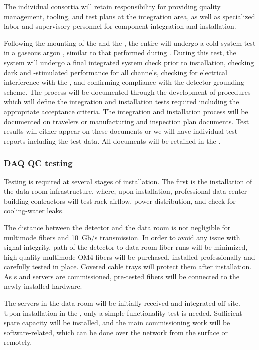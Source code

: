 The individual consortia will retain responsibility for providing quality management, tooling, and test plans at the integration area, as well as specialized labor and supervisory personnel for component integration and installation.

Following the mounting of the   and the , the entire  will undergo a cold system test in a gaseous argon \coldbox, similar to that performed during . During this test, the system will undergo a final integrated system check prior to installation, checking dark and -stimulated  performance for all channels, checking for electrical interference with the , and confirming compliance with the detector grounding scheme.
The  process will be documented through the development of procedures which will define the integration and installation tests required including the appropriate acceptance criteria. 
The integration and installation process will be documented on travelers or manufacturing and inspection plan documents. 
Test results will either appear on these documents or we will have individual test reports including the test data. 
All documents will be retained in the .



\subsubsection{DAQ QC testing}

Testing is required at several stages of  installation.  The first is the installation of the data room infrastructure, where, upon installation, professional data center building contractors will test rack airflow, power distribution, and check for cooling-water leaks.

The distance between the detector and the data room is not negligible for multimode fibers and \SI{10}{Gb/s} transmission. 
In order to avoid any issue with signal integrity, path of the detector-to-data room fiber runs will be minimized, high quality multimode OM4 fibers will be purchased, installed professionally and carefully tested in place.
Covered cable trays will protect them after installation.  As s and servers are commissioned, pre-tested fibers will be connected to the newly installed hardware.

The  servers in the  data room will be initially received and integrated off site.  Upon installation in the , only a simple functionality test is needed.  Sufficient spare capacity will be installed, and the main commissioning work will be software-related, which can be done over the network from the surface or remotely.

